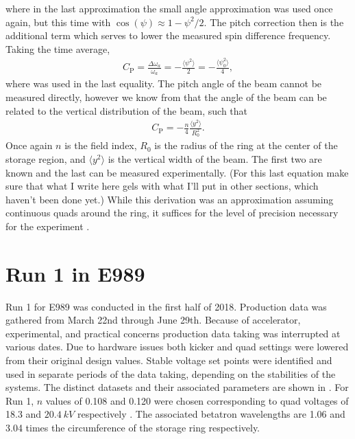 where in the last approximation the small angle approximation was used once again, but this time with $\cos(\psi) \approx 1 - \psi^{2}/2$. The pitch correction then is the additional term which serves to lower the measured spin difference frequency. Taking the time average,
        \begin{align}
            C_{\text{P}} = \frac{\Delta\omega_{a}}{\omega_{a}} = - \frac{\langle \psi^{2} \rangle}{2} = - \frac{\langle \psi_{0}^{2} \rangle}{4},
        \end{align}
where  was used in the last equality. The pitch angle of the beam cannot be measured directly, however we know from  that the angle of the beam can be related to the vertical distribution of the beam, such that 
        \begin{align}
            C_{\text{P}} = - \frac{n}{4} \frac{\langle y^{2} \rangle}{R_{0}^{2}}.
        \end{align}
Once again $n$ is the field index, $R_{0}$ is the radius of the ring at the center of the storage region, and $\langle y^{2} \rangle$ is the vertical width of the beam. The first two are known and the last can be measured experimentally. (For this last equation make sure that what I write here gels with what I'll put in other sections, which haven't been done yet.) While this derivation was an approximation assuming continuous quads around the ring, it suffices for the level of precision necessary for the \gmtwo experiment \cite{something}.



\section{Run 1 in E989}
\label{sec:Run1}


Run 1 for E989 was conducted in the first half of 2018. Production data was gathered from March 22nd through June 29th. Because of accelerator, experimental, and practical concerns production data taking was interrupted at various dates. Due to hardware issues both kicker and quad settings were lowered from their original design values. Stable voltage set points were identified and used in separate periods of the data taking, depending on the stabilities of the systems. The distinct datasets and their associated parameters are shown in . For Run 1, $n$ values of 0.108 and 0.120 were chosen corresponding to quad voltages of 18.3 and $\SI{20.4}{kV}$ respectively \cite{tunetable}. The associated betatron wavelengths are 1.06 and 3.04 times the circumference of the storage ring respectively.




